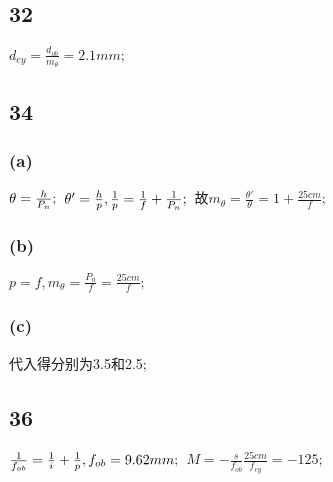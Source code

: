 \documentclass{article}
\begin{document}
\begin{CJK}{UTF8}{gbsn}
		\subsection{32}
		$d_{ey}=\frac{d_{ob}}{m_\theta}=2.1mm;$
		\subsection{34}
		\subsubsection{(a)}
		$\theta=\frac{h}{P_n};\\$
		$\theta'=\frac{h}{p},\frac{1}{p}=\frac{1}{f}+\frac{1}{P_n};\\$
		故$m_\theta=\frac{\theta'}{\theta}=1+\frac{25cm}{f};$
		\subsubsection{(b)}
		$p=f,m_\theta=\frac{P_n}{f}=\frac{25cm}{f};$
		\subsubsection{(c)}
		代入得分别为3.5和2.5;
		\subsection{36}
		$\frac{1}{f_{ob}}=\frac{1}{i}+\frac{1}{p},f_{ob}=9.62mm;\\$
		$M=-\frac{s}{f_{ob}}\frac{25cm}{f_{ey}}=-125;$
	\end{CJK}
\end{document}
